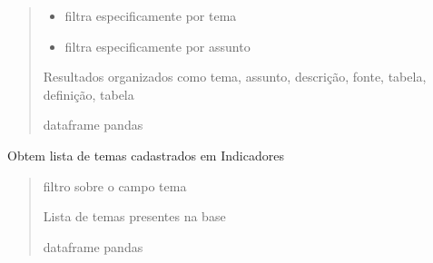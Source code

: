 \documentclass[letterpaper,10pt,brazil]{sphinxmanual}
\begin{document}
\begin{fulllineitems}
\begin{fulllineitems}
\begin{quote}
\begin{description}
\begin{itemize}
\item {} 
\sphinxAtStartPar
{} \textendash{} filtra especificamente por tema

\item {} 
\sphinxAtStartPar
{} \textendash{} filtra especificamente por assunto

\end{itemize}

\sphinxAtStartPar
Resultados organizados como tema, assunto, descrição, fonte, tabela, definição, tabela

\sphinxAtStartPar
dataframe \sphinxhyphen{} pandas

\end{description}\end{quote}

\end{fulllineitems}


\begin{fulllineitems}
\label{\detokenize{api_gen/apiModulo.api_consulta:apiModulo.api_consulta.ApiConsulta.lstTema}}
\pysigstartsignatures
{}
\pysigstopsignatures
\sphinxAtStartPar
Obtem lista de temas cadastrados em Indicadores
\begin{quote}\begin{description}
\sphinxAtStartPar
{} \textendash{} filtro sobre o campo tema

\sphinxAtStartPar
Lista de temas presentes na base

\sphinxAtStartPar
dataframe \sphinxhyphen{} pandas

\end{description}\end{quote}

\end{fulllineitems}



\end{fulllineitems}
\end{document}
